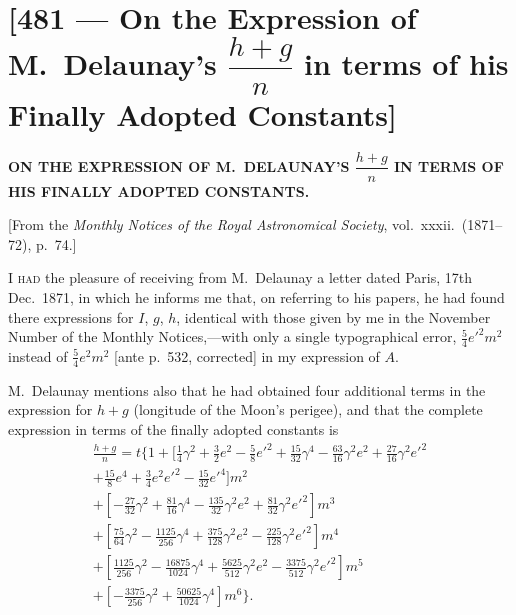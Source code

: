 \documentclass[11pt,a4paper]{article}
\theoremstyle{plain}
\theoremstyle{definition}
\theoremstyle{remark}
\begin{document}
\vspace{2em}

\newpage
\section*{[481 --- On the Expression of M.\ Delaunay's $\dfrac{h+g}{n}$ in terms of his Finally Adopted Constants]}


\begin{center}
\textbf{ON THE EXPRESSION OF M.\ DELAUNAY'S $\dfrac{h+g}{n}$ IN TERMS OF HIS FINALLY ADOPTED CONSTANTS.}
\end{center}

[From the \textit{Monthly Notices of the Royal Astronomical Society}, vol.\ xxxii.\ (1871--72), p.\ 74.]

\bigskip

I \textsc{had} the pleasure of receiving from M.\ Delaunay a letter dated Paris, 17th Dec.\ 1871, in which he informs me that, on referring to his papers, he had found there expressions for $I$, $g$, $h$, identical with those given by me in the November Number of the Monthly Notices,---with only a single typographical error, $\tfrac54 e'^{2}m^{2}$ instead of $\tfrac54 e^{2}m^{2}$ [ante p.~532, corrected] in my expression of $A$.

M.\ Delaunay mentions also that he had obtained four additional terms in the expression for $h+g$ (longitude of the Moon's perigee), and that the complete expression in terms of the finally adopted constants is
\begin{multline*}
\frac{h+g}{n}=t\{1+[\tfrac14 \gamma^{2} + \tfrac32 e^{2} - \tfrac{5}{8}e'^{2} + \tfrac{15}{32}\gamma^{4} - \tfrac{63}{16}\gamma^{2}e^{2} + \tfrac{27}{16}\gamma^{2}e'^{2}\\
+ \tfrac{15}{8}e^{4} + \tfrac{3}{4}e^{2}e'^{2} - \tfrac{15}{32}e'^{4}]m^{2}\\
+ [-\tfrac{27}{32}\gamma^{2} + \tfrac{81}{16}\gamma^{4} - \tfrac{135}{32}\gamma^{2}e^{2} + \tfrac{81}{32}\gamma^{2}e'^{2}]m^{3}\\
+ [\tfrac{75}{64}\gamma^{2} - \tfrac{1125}{256}\gamma^{4} + \tfrac{375}{128}\gamma^{2}e^{2} - \tfrac{225}{128}\gamma^{2}e'^{2}]m^{4}\\
+ [\tfrac{1125}{256}\gamma^{2} - \tfrac{16875}{1024}\gamma^{4} + \tfrac{5625}{512}\gamma^{2}e^{2} - \tfrac{3375}{512}\gamma^{2}e'^{2}]m^{5}\\
+ [-\tfrac{3375}{256}\gamma^{2} + \tfrac{50625}{1024}\gamma^{4}]m^{6}\}.
\end{multline*}
\end{document}
